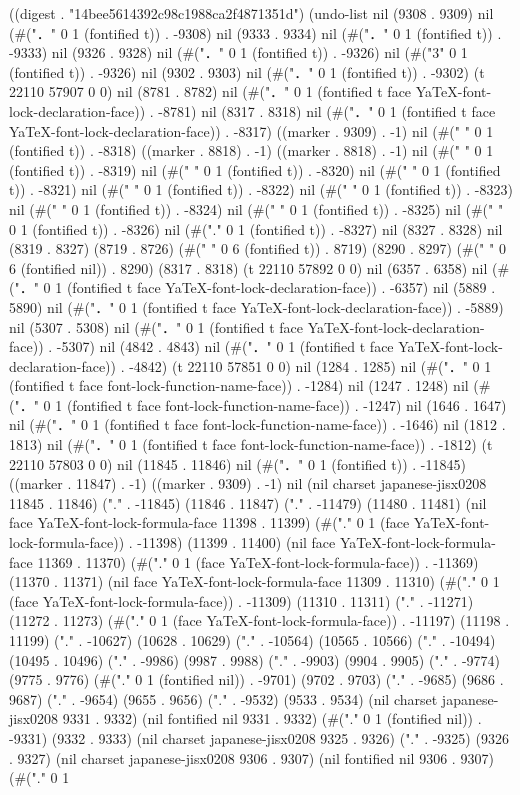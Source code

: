 
((digest . "14bee5614392c98c1988ca2f4871351d") (undo-list nil (9308 . 9309) nil (#("．" 0 1 (fontified t)) . -9308) nil (9333 . 9334) nil (#("．" 0 1 (fontified t)) . -9333) nil (9326 . 9328) nil (#("．" 0 1 (fontified t)) . -9326) nil (#("3" 0 1 (fontified t)) . -9326) nil (9302 . 9303) nil (#("．" 0 1 (fontified t)) . -9302) (t 22110 57907 0 0) nil (8781 . 8782) nil (#("．" 0 1 (fontified t face YaTeX-font-lock-declaration-face)) . -8781) nil (8317 . 8318) nil (#("．" 0 1 (fontified t face YaTeX-font-lock-declaration-face)) . -8317) ((marker . 9309) . -1) nil (#("
" 0 1 (fontified t)) . -8318) ((marker . 8818) . -1) ((marker . 8818) . -1) nil (#(" " 0 1 (fontified t)) . -8319) nil (#(" " 0 1 (fontified t)) . -8320) nil (#(" " 0 1 (fontified t)) . -8321) nil (#(" " 0 1 (fontified t)) . -8322) nil (#(" " 0 1 (fontified t)) . -8323) nil (#(" " 0 1 (fontified t)) . -8324) nil (#(" " 0 1 (fontified t)) . -8325) nil (#(" " 0 1 (fontified t)) . -8326) nil (#("." 0 1 (fontified t)) . -8327) nil (8327 . 8328) nil (8319 . 8327) (8719 . 8726) (#("      " 0 6 (fontified t)) . 8719) (8290 . 8297) (#("      " 0 6 (fontified nil)) . 8290) (8317 . 8318) (t 22110 57892 0 0) nil (6357 . 6358) nil (#("．" 0 1 (fontified t face YaTeX-font-lock-declaration-face)) . -6357) nil (5889 . 5890) nil (#("．" 0 1 (fontified t face YaTeX-font-lock-declaration-face)) . -5889) nil (5307 . 5308) nil (#("．" 0 1 (fontified t face YaTeX-font-lock-declaration-face)) . -5307) nil (4842 . 4843) nil (#("．" 0 1 (fontified t face YaTeX-font-lock-declaration-face)) . -4842) (t 22110 57851 0 0) nil (1284 . 1285) nil (#("．" 0 1 (fontified t face font-lock-function-name-face)) . -1284) nil (1247 . 1248) nil (#("．" 0 1 (fontified t face font-lock-function-name-face)) . -1247) nil (1646 . 1647) nil (#("．" 0 1 (fontified t face font-lock-function-name-face)) . -1646) nil (1812 . 1813) nil (#("．" 0 1 (fontified t face font-lock-function-name-face)) . -1812) (t 22110 57803 0 0) nil (11845 . 11846) nil (#("．" 0 1 (fontified t)) . -11845) ((marker . 11847) . -1) ((marker . 9309) . -1) nil (nil charset japanese-jisx0208 11845 . 11846) ("." . -11845) (11846 . 11847) ("." . -11479) (11480 . 11481) (nil face YaTeX-font-lock-formula-face 11398 . 11399) (#("." 0 1 (face YaTeX-font-lock-formula-face)) . -11398) (11399 . 11400) (nil face YaTeX-font-lock-formula-face 11369 . 11370) (#("." 0 1 (face YaTeX-font-lock-formula-face)) . -11369) (11370 . 11371) (nil face YaTeX-font-lock-formula-face 11309 . 11310) (#("." 0 1 (face YaTeX-font-lock-formula-face)) . -11309) (11310 . 11311) ("." . -11271) (11272 . 11273) (#("." 0 1 (face YaTeX-font-lock-formula-face)) . -11197) (11198 . 11199) ("." . -10627) (10628 . 10629) ("." . -10564) (10565 . 10566) ("." . -10494) (10495 . 10496) ("." . -9986) (9987 . 9988) ("." . -9903) (9904 . 9905) ("." . -9774) (9775 . 9776) (#("." 0 1 (fontified nil)) . -9701) (9702 . 9703) ("." . -9685) (9686 . 9687) ("." . -9654) (9655 . 9656) ("." . -9532) (9533 . 9534) (nil charset japanese-jisx0208 9331 . 9332) (nil fontified nil 9331 . 9332) (#("." 0 1 (fontified nil)) . -9331) (9332 . 9333) (nil charset japanese-jisx0208 9325 . 9326) ("." . -9325) (9326 . 9327) (nil charset japanese-jisx0208 9306 . 9307) (nil fontified nil 9306 . 9307) (#("." 0 1 